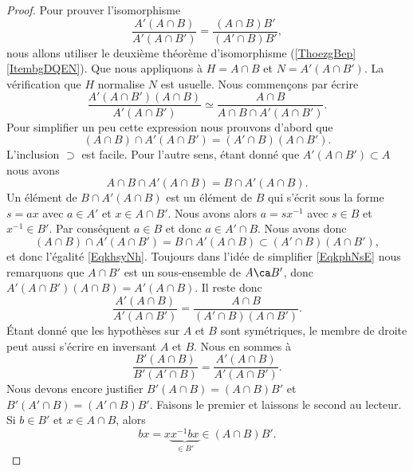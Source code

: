 \begin{proof}
    Pour prouver l'isomorphisme
    \begin{equation}
        \frac{ A'(A\cap B) }{ A'(A\cap B') }=\frac{ (A\cap B)B' }{ (A'\cap B)B' },
    \end{equation}
    nous allons utiliser le deuxième théorème d'isomorphisme (\ref{ThoezgBep}\ref{ItembgDQEN}). Que nous appliquons à \( H=A\cap B\) et \( N=A'(A\cap B')\). La vérification que \( H\) normalise \( N\) est usuelle. Nous commençons par écrire
    \begin{equation}    \label{EqkphNsE}
        \frac{ A'(A\cap B')(A\cap B) }{ A'(A\cap B') }\simeq\frac{ A\cap B }{ A\cap B\cap A'(A\cap B') }.
    \end{equation}
    Pour simplifier un peu cette expression nous prouvons d'abord que
    \begin{equation}    \label{EqkhsyNh}
        (A\cap B)\cap A'(A\cap B')=(A'\cap B)(A\cap B').
    \end{equation}
    L'inclusion \( \supset\) est facile. Pour l'autre sens, étant donné que \( A'(A\cap B')\subset A\) nous avons
    \begin{equation}
        A\cap B\cap A'(A\cap B)=B\cap A'(A\cap B).
    \end{equation}
    Un élément de \( B\cap A'(A\cap B)\) est un élément de \(   B\) qui s'écrit sous la forme \( s=ax\) avec \( a\in A'\) et \( x\in A\cap B'\). Nous avons alors \( a=sx^{-1}\) avec \( s\in B\) et \( x^{-1} \in B'\). Par conséquent \( a\in B\) et donc \( a\in A'\cap B\). Nous avons donc
    \begin{equation}
        (A\cap B)\cap A'(A\cap B')=B\cap A'(A\cap B)\subset (A'\cap B)(A\cap B'),
    \end{equation}
    et donc l'égalité \eqref{EqkhsyNh}. Toujours dans l'idée de simplifier \eqref{EqkphNsE} nous remarquons que \( A\cap B'\) est un sous-ensemble de \( A\ca B'\), donc \( A'(A\cap B')(A\cap B)=A'(A\cap B)\). Il reste donc
    \begin{equation}
        \frac{ A'(A\cap B) }{ A'(A\cap B') }=\frac{ A\cap B }{ (A'\cap B)(A\cap B') }.
    \end{equation}
    Étant donné que les hypothèses sur \( A\) et \( B\) sont symétriques, le membre de droite peut aussi s'écrire en inversant \( A\) et \( B\). Nous en sommes à
    \begin{equation}
        \frac{ B'(A\cap B) }{ B'(A'\cap B) }=\frac{ A'(A\cap B) }{ A'(A\cap B') }.
    \end{equation}
    Nous devons encore justifier \( B'(A\cap B)=(A\cap B)B'\) et \( B'(A'\cap B)=(A'\cap B)B'\). Faisons le premier et laissons le second au lecteur.
    Si \( b\in B'\) et \( x\in A\cap B\), alors
    \begin{equation}
        bx=x\underbrace{x^{-1}bx}_{\in B'}\in (A\cap B)B'.
    \end{equation}
\end{proof}


